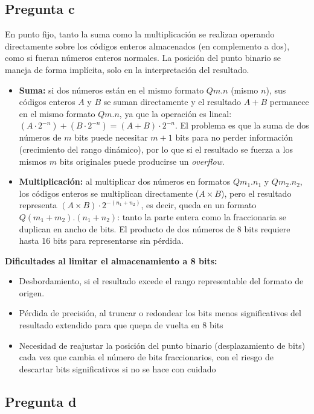 \documentclass[conference]{IEEEtran}
\begin{document}
\subsection{Pregunta c}

En punto fijo, tanto la suma como la multiplicación se realizan operando directamente sobre los códigos enteros almacenados (en complemento a dos), como si fueran números enteros normales.
La posición del punto binario se maneja de forma implícita, solo en la interpretación del resultado.
\begin{itemize}
    \item \textbf{Suma:} si dos números están en el mismo formato $Qm.n$ (mismo $n$), sus códigos enteros $A$ y $B$ se suman directamente y el resultado $A+B$ permanece en el mismo formato $Qm.n$, ya que la operación es lineal: $(A\cdot2^{-n})+(B\cdot2^{-n})=(A+B)\cdot2^{-n}$. 
    El problema es que la suma de dos números de $m$ bits puede necesitar $m+1$ bits para no perder información (crecimiento del rango dinámico), por lo que si el resultado se fuerza a los mismos $m$ bits originales puede producirse un \textit{overflow}.
    \item \textbf{Multiplicación:} al multiplicar dos números en formatos $Qm_1.n_1$ y $Qm_2.n_2$, los códigos enteros se multiplican directamente ($A\times B$), pero el resultado representa $(A\times B)\cdot2^{-(n_1+n_2)}$, es decir, queda en un formato $Q(m_1+m_2).(n_1+n_2)$: tanto la parte entera como la fraccionaria se duplican en ancho de bits. 
    El producto de dos números de 8 bits requiere hasta 16 bits para representarse sin pérdida.

\end{itemize}
\textbf{Dificultades al limitar el almacenamiento a 8 bits:} 
\begin{itemize}
    \item Desbordamiento, si el resultado excede el rango representable del formato de origen.
    \item Pérdida de precisión, al truncar o redondear los bits menos significativos del resultado extendido para que quepa de vuelta en 8 bits
    \item Necesidad de reajustar la posición del punto binario (desplazamiento de bits) cada vez que cambia el número de bits fraccionarios, con el riesgo de descartar bits significativos si no se hace con cuidado
\end{itemize}


\subsection{Pregunta d}
\end{document}
